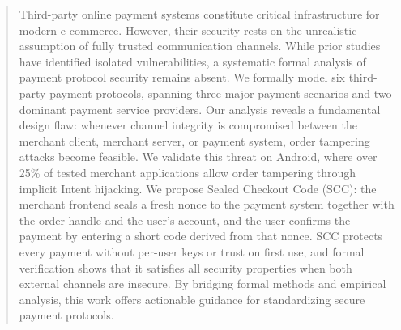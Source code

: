 \begin{abstract}
Third-party online payment systems constitute critical infrastructure for modern e-commerce.
However, their security rests on the unrealistic assumption of fully trusted communication channels. 
While prior studies have identified isolated vulnerabilities, a systematic formal analysis of payment protocol security remains absent. 
We formally model six third-party payment protocols, spanning three major payment scenarios and two dominant payment service providers. 
Our analysis reveals a fundamental design flaw: 
whenever channel integrity is compromised between the merchant client, merchant server, or payment system, order tampering attacks become feasible.
We validate this threat on Android, where over 25\% of tested merchant applications allow order tampering through implicit Intent hijacking.
We propose Sealed Checkout Code (SCC): the merchant frontend seals a fresh nonce to the payment system together with the order handle and the user's account, and the user confirms the payment by entering a short code derived from that nonce.
SCC protects every payment without per-user keys or trust on first use, and formal verification shows that it satisfies all security properties when both external channels are insecure.
By bridging formal methods and empirical analysis, this work offers actionable guidance for standardizing secure payment protocols.
\end{abstract}